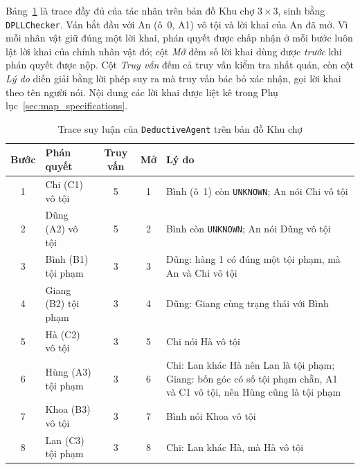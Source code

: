 \begin{sloppypar}
Bảng~\ref{tab:market_trace} là trace đầy đủ của tác nhân trên bản đồ Khu chợ
$3\times3$, sinh bằng \texttt{DPLLChecker}. Ván bắt đầu với An (ô~$0$, A1) vô
tội và lời khai của An đã mở. Vì mỗi nhân vật giữ đúng một lời khai, phán quyết
được chấp nhận ở mỗi bước luôn lật lời khai của chính nhân vật đó; cột
\emph{Mở} đếm số lời khai dùng được \emph{trước} khi phán quyết được nộp. Cột
\emph{Truy vấn} đếm cả truy vấn kiểm tra nhất quán, còn cột \emph{Lý do} diễn
giải bằng lời phép suy ra mà truy vấn bác bỏ xác nhận, gọi lời khai theo tên
người nói. Nội dung các lời khai được liệt kê trong
Phụ lục~\ref{sec:map_specifications}.

\begin{table}[htbp]
  \centering\small
  \caption{Trace suy luận của \texttt{DeductiveAgent} trên bản đồ Khu chợ}
  \label{tab:market_trace}
  \begin{tabularx}{\textwidth}{clcc>{\raggedright\arraybackslash}X}
    \toprule
    \textbf{Bước} & \textbf{Phán quyết} & \textbf{Truy vấn} & \textbf{Mở}
      & \textbf{Lý do} \\
    \midrule
    1 & Chi (C1) vô tội     & 5 & 1
      & Bình (ô~1) còn \texttt{UNKNOWN}; An nói Chi vô tội \\
    2 & Dũng (A2) vô tội    & 5 & 2
      & Bình còn \texttt{UNKNOWN}; An nói Dũng vô tội \\
    3 & Bình (B1) tội phạm  & 3 & 3
      & Dũng: hàng 1 có đúng một tội phạm, mà An và Chi vô tội \\
    4 & Giang (B2) tội phạm & 3 & 4
      & Dũng: Giang cùng trạng thái với Bình \\
    5 & Hà (C2) vô tội      & 3 & 5
      & Chi nói Hà vô tội \\
    6 & Hùng (A3) tội phạm  & 3 & 6
      & Chi: Lan khác Hà nên Lan là tội phạm; Giang: bốn góc có số tội phạm
        chẵn, A1 và C1 vô tội, nên Hùng cũng là tội phạm \\
    7 & Khoa (B3) vô tội    & 3 & 7
      & Bình nói Khoa vô tội \\
    8 & Lan (C3) tội phạm   & 3 & 8
      & Chi: Lan khác Hà, mà Hà vô tội \\
    \bottomrule
  \end{tabularx}
\end{table}


\end{sloppypar}
